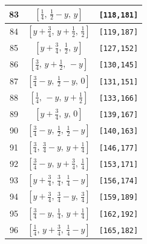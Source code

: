 \documentclass[fleqn,8pt]{jsarticle}
\begin{document}
\begin{longtable}{ccc}
83 & $\left[ \frac{1}{4},\, \frac{1}{2} - y,\, y \right]$ & {\tt [118,181]} \\ \hline
84 & $\left[ y + \frac{3}{4},\, y + \frac{1}{2},\, \frac{1}{2} \right]$ & {\tt [119,187]} \\ \hline
85 & $\left[ y + \frac{3}{4},\, \frac{1}{2},\, y \right]$ & {\tt [127,152]} \\ \hline
86 & $\left[ \frac{3}{4},\, y + \frac{1}{2},\, - y \right]$ & {\tt [130,145]} \\ \hline
87 & $\left[ \frac{3}{4} - y,\, \frac{1}{2} - y,\, 0 \right]$ & {\tt [131,151]} \\ \hline
88 & $\left[ \frac{1}{4},\, - y,\, y + \frac{1}{2} \right]$ & {\tt [133,166]} \\ \hline
89 & $\left[ y + \frac{3}{4},\, y,\, 0 \right]$ & {\tt [139,167]} \\ \hline
90 & $\left[ \frac{3}{4} - y,\, \frac{1}{2},\, \frac{1}{2} - y \right]$ & {\tt [140,163]} \\ \hline
91 & $\left[ \frac{3}{4},\, \frac{3}{4} - y,\, y + \frac{1}{4} \right]$ & {\tt [146,177]} \\ \hline
92 & $\left[ \frac{3}{4} - y,\, y + \frac{3}{4},\, \frac{1}{4} \right]$ & {\tt [153,171]} \\ \hline
93 & $\left[ y + \frac{3}{4},\, \frac{3}{4},\, \frac{1}{4} - y \right]$ & {\tt [156,174]} \\ \hline
94 & $\left[ y + \frac{3}{4},\, \frac{3}{4} - y,\, \frac{3}{4} \right]$ & {\tt [159,189]} \\ \hline
95 & $\left[ \frac{3}{4} - y,\, \frac{1}{4},\, y + \frac{1}{4} \right]$ & {\tt [162,192]} \\ \hline
96 & $\left[ \frac{1}{4},\, y + \frac{3}{4},\, \frac{1}{4} - y \right]$ & {\tt [165,182]} \\
\end{longtable}
\renewcommand{\arraystretch}{1.2}
\end{document}

